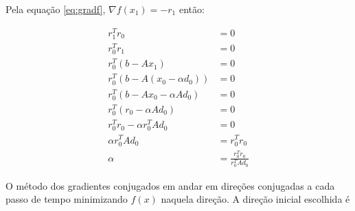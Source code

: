 Pela equação \ref{eq:gradf}, $\nabla f(x_1) = -r_1 $ então:


\begin{align}
     r_1^T r_0                         & =  0 \\
     r_0^T r_1                         & =  0 \\
     r_0^T (b - Ax_1)                  & =  0 \\
     r_0^T (b - A(x_0 - \alpha d_0))   & =  0 \\
     r_0^T (b - Ax_0  - \alpha A d_0)  & =  0 \\
     r_0^T (r_0 - \alpha A d_0)        & =  0 \\
     r_0^T r_0 - \alpha  r_0^T A d_0   & =  0 \\
     \alpha  r_0^T A d_0               & =  r_0^T r_0 \\
     \alpha                            & =  \frac{r_0^T r_0}{r_0^T Ad_0}
\end{align}

O método dos gradientes conjugados em andar em direções conjugadas a cada passo de tempo minimizando $f(x)$ naquela direção. A direção inicial escolhida é